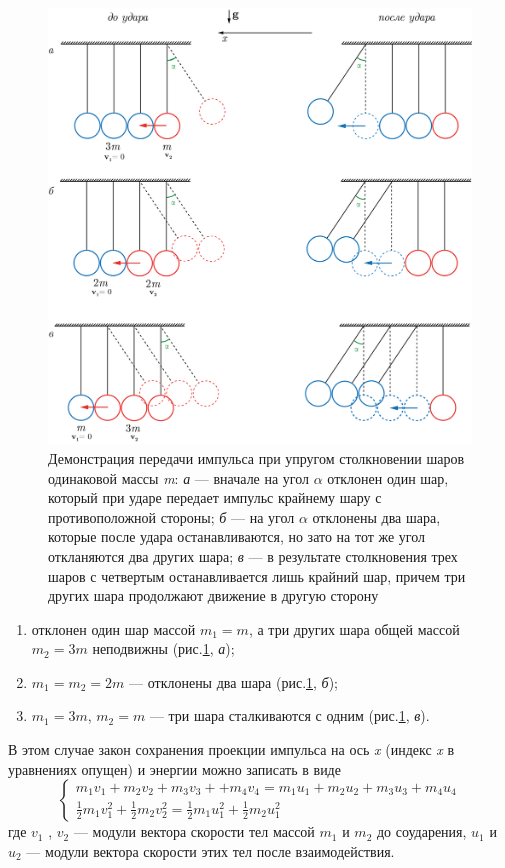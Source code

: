 \documentclass[14pt,a4paper,oneside]{extarticle}	%
\begin{document}
 \begin{figure}[H] 
	\centering 	
	\includegraphics[width=0.8\linewidth]{impact-4.png}
	\caption{Демонстрация передачи импульса при упругом столкновении шаров одинаковой массы \textit{m}: \textit{а} — вначале на угол $ \alpha $ отклонен один шар, который при ударе передает импульс крайнему шару с противоположной стороны; \textit{б} — на угол $ \alpha $ отклонены два шара, которые после удара останавливаются, но зато на тот же угол откланяются два других шара; \textit{в} — в результате столкновения трех шаров с четвертым останавливается лишь крайний шар, причем три других шара продолжают движение в другую сторону}\label{impact-4}
\end{figure}

\begin{enumerate}
	\item отклонен один шар массой $ m_1=m $, а три других шара общей массой $ m_2=3m $ неподвижны (рис.\ref{impact-4}, \textit{а});
	\item $ m_1=m_2=2m $ — отклонены два шара  (рис.\ref{impact-4}, \textit{б});
	\item $ m_1=3m $, $ m_2=m $ — три шара сталкиваются с одним  (рис.\ref{impact-4}, \textit{в}).
\end{enumerate}

В этом случае закон сохранения проекции импульса на ось \textit{x} (индекс \textit{x} в уравнениях опущен) и энергии можно записать в виде
\begin{equation}\label{impact-eq1}
 \begin{cases}
m_{1}v_{1} + m_{2}v_{2} + m_{3}v_{3} + + m_{4}v_{4} = m_{1}u_{1} + m_{2}u_{2} + m_{3}u_{3} + m_{4}u_{4} \\
\frac{1}{2}m_{1}v_{1}^{2} + \frac{1}{2}m_{2}v_{2}^{2} = \frac{1}{2}m_{1}u_{1}^{2} + \frac{1}{2}m_{2}u_{1}^{2}
 \end{cases}
\end{equation}
где $ v_{1} $ , $ v_{2} $ — модули вектора скорости тел массой $ m_1 $ и $ m_2  $ до соударения, $ u_{1} $ и $ u_{2} $ — модули вектора скорости этих тел после взаимодействия. 
\end{document}
